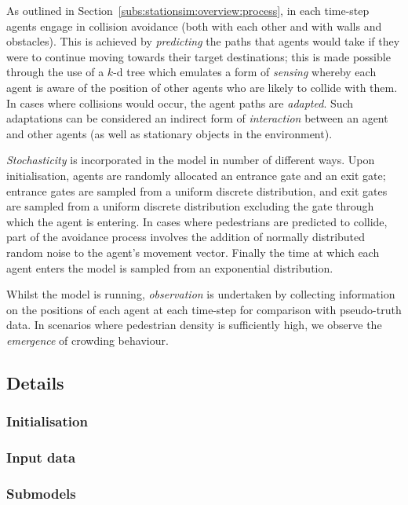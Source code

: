 As outlined in Section~\ref{subs:stationsim:overview:process}, in each time-step
agents engage in collision avoidance (both with each other and with walls and
obstacles).
This is achieved by \emph{predicting} the paths that agents would take if they
were to continue moving towards their target destinations; this is made possible
through the use of a $k$-d tree which emulates a form of \emph{sensing} whereby
each agent is aware of the position of other agents who are likely to collide
with them.
In cases where collisions would occur, the agent paths are \emph{adapted}.
Such adaptations can be considered an indirect form of \emph{interaction}
between an agent and other agents (as well as stationary objects in the
environment).

\emph{Stochasticity} is incorporated in the model in number of different ways.
Upon initialisation, agents are randomly allocated an entrance gate and an exit
gate; entrance gates are sampled from a uniform discrete distribution, and exit
gates are sampled from a uniform discrete distribution excluding the gate
through which the agent is entering.
In cases where pedestrians are predicted to collide, part of the avoidance
process involves the addition of normally distributed random noise to the
agent's movement vector.
Finally the time at which each agent enters the model is sampled from an
exponential distribution.

Whilst the model is running, \emph{observation} is undertaken by collecting
information on the positions of each agent at each time-step for comparison with
pseudo-truth data.
In scenarios where pedestrian density is sufficiently high, we observe the
\emph{emergence} of crowding behaviour.

\subsection{Details}\label{sub:stationsim:details}

\subsubsection{Initialisation}\label{subs:stationsim:details:initialisation}

\subsubsection{Input data}\label{subs:stationsim:details:input}

\subsubsection{Submodels}\label{subs:stationsim:details:submodels}

